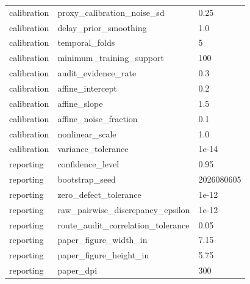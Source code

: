 \begin{tabular}{lll}
calibration & proxy\_calibration\_noise\_sd & 0.25 \\
calibration & delay\_prior\_smoothing & 1.0 \\
calibration & temporal\_folds & 5 \\
calibration & minimum\_training\_support & 100 \\
calibration & audit\_evidence\_rate & 0.3 \\
calibration & affine\_intercept & 0.2 \\
calibration & affine\_slope & 1.5 \\
calibration & affine\_noise\_fraction & 0.1 \\
calibration & nonlinear\_scale & 1.0 \\
calibration & variance\_tolerance & 1e-14 \\
reporting & confidence\_level & 0.95 \\
reporting & bootstrap\_seed & 2026080605 \\
reporting & zero\_defect\_tolerance & 1e-12 \\
reporting & raw\_pairwise\_discrepancy\_epsilon & 1e-12 \\
reporting & route\_audit\_correlation\_tolerance & 0.05 \\
reporting & paper\_figure\_width\_in & 7.15 \\
reporting & paper\_figure\_height\_in & 5.75 \\
reporting & paper\_dpi & 300 \\
\bottomrule
\end{tabular}
